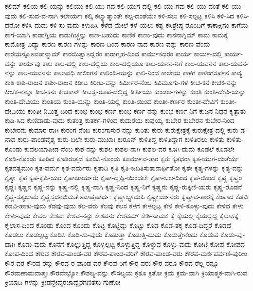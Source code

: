 ಕಲಿಮ್
ಕಲಿಯ
ಕಲಿ-ಯನ್ನು
ಕಲಿಯು
ಕಲಿ-ಯು-ಗದ
ಕಲಿ-ಯುಗ-ದಲ್ಲಿ
ಕಲಿ-ಯು-ಗವು
ಕಲಿ-ಯು-ವಂತೆ
ಕಲಿ-ಯು-ವುದು
ಕಲಿ-ಸುವ-ವ-ನಾಗಿ
ಕಲೇರ್ಯಃ
ಕಲ್ಕಿ
ಕಲ್ಕ್ಯಾತ್ಮಾಂತೇ
ಕಲ್ಪ-ದಂತೆಯೇ
ಕಳಿ-ಸಲು
ಕಳಿ-ಸಲ್ಪಟ್ಟ
ಕಳಿಸಿ
ಕಳಿ-ಸಿದ
ಕಳಿಸಿ-ದನೋ
ಕಳಿಸಿ-ದುದು
ಕಳಿ-ಸು-ವುದು
ಕಳುಹಿಸಿ
ಕಳೆದ-ಮೇಲೆ
ಕಳೆ-ಯಲು
ಕಶ್ಯ
ಕಸಿಶ್ರೇಷ್ಠ-ರೊಂದಿಗೆ
ಕಾಕಾಕ್ಷಿಗಂ
ಕಾಗೆಯ
ಕಾಗೆ-ಯಾಗಿ
ಕಾಡಾಗ್ನಿಯ
ಕಾಡುಗಿಚ್ಚನ್ನು
ಕಾಣ-ಬಹುದು
ಕಾಣಿಕೆ
ಕಾಣು-ವುದು
ಕಾನನಾಗ್ನಿಮ್
ಕಾಮ
ಕಾಮಕ್ಕೆ
ಕಾಮೋತ್ರ-ವಿದ್ಯಾ
ಕಾರಣ
ಕಾರಣ-ಗಳನ್ನು
ಕಾರಣ-ದಿಂದ
ಕಾರಣ-ನಾದ
ಕಾರಣ-ವನ್ನು
ಕಾರಣ-ವೆಂದು
ಕಾರಯನ್ನೊಽವತಾನ್ಮಾಮ್
ಕಾರಯಿತ್ವಾಽಧ್ವರಂ
ಕಾರಾಗೃಹ-ದಿಂದ
ಕಾರ್ಮುಕಧರಂ
ಕಾರ್ಯ
ಕಾರ್ಯ-ದಲ್ಲಿ
ಕಾರ್ಯ-ವನ್ನು
ಕಾರ್ಯವು
ಕಾಲ
ಕಾಲ-ದಲ್ಲಿ
ಕಾಲ-ದಲ್ಲಿಯ
ಕಾಲ-ದಲ್ಲಿಯೂ
ಕಾಲ-ಯನನ-ನಿಗೆ
ಕಾಲ-ಯವನನ
ಕಾಲ-ಯವನ-ನನ್ನು
ಕಾಲ-ಯವನನು
ಕಾಲಾವಧಿ
ಕಾಲಿಂಗನ
ಕಾಲಿಂದಿ-ಯನ್ನು
ಕಾಲಿ-ನಿಂದ
ಕಾಲೇಯ
ಕಾಳಗ
ಕಾಳಿಂಗಸರ್ಪನ
ಕಾವ್ಯ
ಕಾಶಿ
ಕಾಶಿ-ರಾಜನ
ಕಾಶೀ-ರಾಜನ
ಕಿರೀಟ
ಕಿರೀಟ-ವನ್ನು
ಕಿರ್ಮೀರ-ನೆಂಬ
ಕಿವಿಮೂಗು-ಗಳ
ಕೀಚ-ಕನ
ಕೀಚಕ-ನನ್ನು
ಕೀಚಕ-ನನ್ನೂ
ಕೀಚ-ಕನು
ಕೀಚಕಾನ್
ಕೀಟಸ್ವ-ರೂಪ-ದಲ್ಲಿದ್ದ
ಕೀರ್ತಿಯು
ಕುಂಡಲ-ಗಳನ್ನು
ಕುಂತಿ
ಕುಂತಿ-ದೇವಿ-ಯನ್ನು
ಕುಂತಿ-ದೇವಿಯು
ಕುಂತಿಯ
ಕುಂತಿ-ಯನ್ನು
ಕುಂತಿ-ಯಲ್ಲಿ
ಕುಂತಿ-ಯಿಂದ
ಕುಂತೀ-ಕರ್ಣರ
ಕುಂತೀ-ದೇವಿಗೆ
ಕುಂತೀ-ದೇವಿಯು
ಕುಂತೀ-ನಿಮಿತ್ತ-ದಿಂದ
ಕುಂಭ
ಕುಂಭ-ಕರ್ಣ
ಕುಂಭ-ಕರ್ಣ-ನನ್ನು
ಕುಂಭ-ಕರ್ಣ-ನಿಗೆ
ಕುಜನ-ನಿಧನ-ಕೃತ್ಪಾತು
ಕುಡಿ-ಸಿದ
ಕುಣಿದಾಡು-ವುದು
ಕುತಂತ್ರ
ಕುತರ್ಕ-ಗಳಿಂದ
ಕುದುರೆಯ
ಕುಪ್ಪಯ್ಯ
ಕುಬೇರ
ಕುಬೇರನ
ಕುಬೇರ-ನಿಂದ
ಕುಬೇರನು
ಕುಮಾರ-ರಾಗಿ
ಕುರಂಗ-ನೆಂಬ
ಕುರಂಗಾಸುರ-ನನ್ನು
ಕುರಿತು
ಕುರು
ಕುರುಕ್ಷೇತ್ರಕ್ಕೆ
ಕುರುಕ್ಷೇತ್ರ-ದಲ್ಲಿ
ಕುರು-ಡ-ನಾದ
ಕುರು-ಪಾಂಡವೈಶ್ಯ
ಕುರು-ಬಲೇ
ಕುರು-ಮುಖಾಃ
ಕುರೂನ್
ಕುಳಿತಿದ್ದ
ಕುಳಿತಿದ್ದಾಗ
ಕುಳಿತಿರಲು
ಕುಳಿತು
ಕುಳಿತು-ಕೊಂಡು
ಕುವಲಯಾಪೀಡ-ನೆಂಬ
ಕುಶ-ನನ್ನು
ಕುಶಲ
ಕುಶಲ-ನಾಗಿ
ಕುಶಲ-ವರ
ಕೂಗಿ-ದುದು
ಕೂಡಲೆ
ಕೂಡಲೇ
ಕೂಡಿ-ಕೊಂಡು
ಕೂಡಿದ
ಕೂಡಿರುತ್ತದೆ
ಕೂಡಿಸಿ-ಕೊಂಡು
ಕೂರ್ಮಾವ-ತಾರ
ಕೃತಃ
ಕೃತಧರಾ
ಕೃತ-ಯುಗ-ದಂತೆಯೇ
ಕೃತವತ್ಯಮುಂ
ಕೃತ-ವರ್ಮ
ಕೃತ-ವರ್ಮರು
ಕೃತಾದಿ
ಕೃತಿ
ಕೃತಿ-ಜದಿತಿಸುತಾನಾರ್ಥಿತೋ
ಕೃತೇ
ಕೃತ್ಯ-ಗಳನ್ನು
ಕೃತ್ಯ-ವನ್ನು
ಕೃತ್ವಾ
ಕೃಪ
ಕೃಪ-ಕೃಪಿ-ಯರ
ಕೃಪಾಚಾರ್ಯರು
ಕೃಪಾ-ದೃಷ್ಟಿ-ಯಿಂದಲೇ
ಕೃಪಾ-ಬಲ-ದಿಂದ
ಕೃಪೆ-ಯಿಂದ
ಕೃಷ್ಣ
ಕೃಷ್ಣಂ
ಕೃಷ್ಣಃ
ಕೃಷ್ಣನ
ಕೃಷ್ಣ-ನನ್ನು
ಕೃಷ್ಣ-ನಲ್ಲಿ
ಕೃಷ್ಣ-ನಾಗಿ
ಕೃಷ್ಣ-ನಿಂದ
ಕೃಷ್ಣ-ನಿಗೆ
ಕೃಷ್ಣನು
ಕೃಷ್ಣ-ರುಕ್ಕಿಣಿ-ಯರು
ಕೃಷ್ಣ-ರೊಡನೆ
ಕೃಷ್ಣ-ಸತ್ಯಭಾಮೆ
ಕೃಷ್ಣಸ್ತದನಭಿಮತೇಽವಾಪ್ತಪಾರ್ಥಃ
ಕೃಷ್ಣಾಭ್ಯಾಮಪಿ
ಕೃಷ್ಣಾರ್ಜುನರು
ಕೃಷ್ಣಾವ-ತಾರಕ್ಕೆ
ಕೆಂಪಾದ
ಕೆಡವಿ
ಕೆಡವಿ-ಹಾಕು-ವುದು
ಕೆಡವು-ವುದು
ಕೆಲ-ವರು
ಕೆಲವು
ಕೆಲಸ
ಕೆಳಗೆ
ಕೇಳಲ್ಪಟ್ಟ
ಕೇಳಿ
ಕೇಳಿ-ಕೊಳ್ಳು-ವುದು
ಕೇಳಿದ
ಕೇಳು
ಕೇಳು-ವುದು
ಕೇವಲ
ಕೇಶವಃ
ಕೇಶವ-ನನ್ನು
ಕೇಶವನು
ಕೇಶವಮ್
ಕೇಶಿ-ನಾಮಕ
ಕೈ
ಕೈಯಲ್ಲಿ
ಕೈಯಲ್ಲಿದ್ದ
ಕೈಲಾಸಕ್ಕೆ
ಕೈಲಾಸ-ದಿಂದ
ಕೊಂಡು
ಕೊಂದ
ಕೊಂದು
ಕೊಟ್ಟ
ಕೊಟ್ಟಿದ್ದು
ಕೊಟ್ಟು
ಕೊಡ
ಕೊಡ-ತಕ್ಕ
ಕೊಡ-ದಿದ್ದರೆ
ಕೊಡದೆ
ಕೊಡಲು
ಕೊಡಲ್ಪಟ್ಟ
ಕೊಡಿಸಿ
ಕೊಡಿ-ಸು-ವುದು
ಕೊಡುತ್ತಾ
ಕೊಡುತ್ತಿ-ದುದು
ಕೊಡುತ್ತೇನೆಂದು
ಕೊಡುವ
ಕೊಡು-ವು-ದಾಗಿ
ಕೊಡು-ವುದು
ಕೊನೆಗೆ
ಕೊಲ್ಲುತ್ತಿದ್ದ
ಕೊಳ್ಳಲ್ಪಟ್ಟ
ಕೊಳ್ಳುತ್ತಿದ್ದ
ಕೊಳ್ಳುವ
ಕೊಳ್ಳು-ವುದು
ಕೋಟಿ
ಕೋಪ
ಕೋಪದ
ಕೋಪ-ದಿಂದ
ಕೌರವ
ಕೌರವ-ಪಾಂಡ-ವರ
ಕೌರವ-ಪಾಂಡ-ವರಿಗೆ
ಕೌರವ-ಪಾಂಡ-ವರು
ಕೌರವ-ಮರ್ಕಪರ್ವಣಿ-ಪುರೀಂ
ಕೌರ-ವರ
ಕೌರವ-ರನ್ನು
ಕೌರವ-ರ-ಪಾಂಡ-ವರ
ಕೌರವ-ರಿಗೆ
ಕೌರ-ವರು
ಕೌರ-ವರೂ
ಕೌರವ-ರೆಲ್ಲ-ರನ್ನೂ
ಕೌರವಾಣಾಮವಾಪ್ತಃ
ಕೌರವೇಭ್ಯೋ
ಕೌಶಲ್ಯ-ವನ್ನು
ಕೌಸಲ್ಯಯ
ಕ್ರತೂ
ಕ್ರತೋ
ಕ್ರಮ
ಕ್ರಮ-ವಾಗಿ
ಕ್ರಿಯಾತ್ಮಕ-ವಾಗಿ-ರುವ
ಕ್ರಿಯಾದಿ-ಗಳನ್ನು
ಕ್ರೀಡನ್ದೇವೈರಜಾದ್ಯೈರಗಣಿತಸು-ಗುಣೋ

